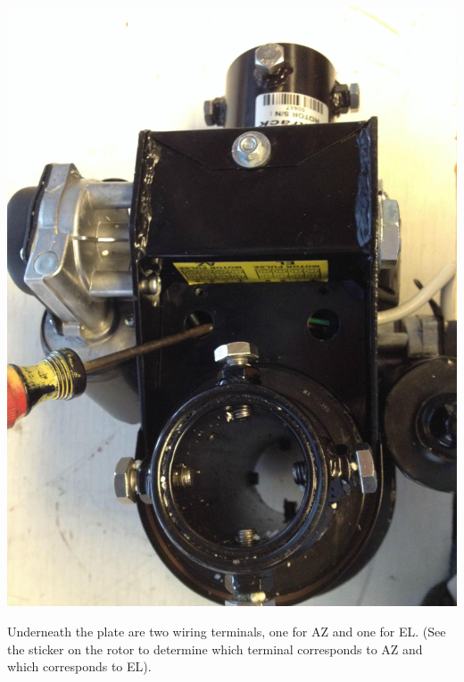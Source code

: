 \documentclass[11pt]{article} %
\begin{document}
\begin{center}
\includegraphics[scale=0.10]{wiring/04.jpeg}
\end{center}


Underneath the plate are two wiring terminals, one for AZ and one for EL. (See the sticker on the rotor to determine which terminal corresponds to AZ and which corresponds to EL).
\end{document}
